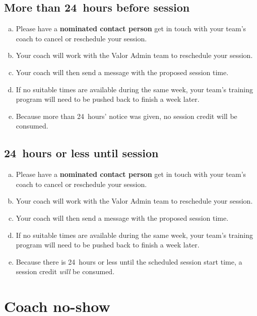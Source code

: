 \documentclass[10pt]{article}
\begin{document}
\subsection{More than 24~hours before session}
\begin{enumerate}[(a)]
\item
Please have a \textbf{nominated contact person} get in touch with your team's coach to cancel or reschedule your session.

\item
Your coach will work with the Valor Admin team to reschedule your session.

\item
Your coach will then send a message with the proposed session time.

\item
If no suitable times are available during the same week, your team's training program will need to be pushed back to finish a week later.

\item
Because more than 24~hours' notice was given, no session credit will be consumed.
\end{enumerate}

\subsection{24~hours or less until session}
\begin{enumerate}[(a)]
\item
Please have a \textbf{nominated contact person} get in touch with your team's coach to cancel or reschedule your session.

\item
Your coach will work with the Valor Admin team to reschedule your session.

\item
Your coach will then send a message with the proposed session time.

\item
If no suitable times are available during the same week, your team's training program will need to be pushed back to finish a week later.

\item
Because there is 24~hours or less until the scheduled session start time, a session credit \textit{will} be consumed.
\end{enumerate}


\section{Coach no-show}
\end{document}
